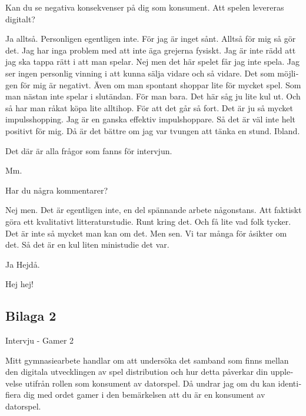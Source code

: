 \documentclass[11p]{article}
\begin{document}
\begin{otherlanguage}{swedish}
        \setlength{\leftskip}{0cm}

        Kan du se negativa konsekvenser på dig som konsument. Att spelen levereras digitalt?

        \setlength{\leftskip}{1cm}

        Ja alltså. Personligen egentligen inte. För jag är inget sånt. Alltså för mig så gör det.
        Jag har inga problem med att inte äga grejerna fysiskt. Jag är inte rädd att jag ska tappa rätt i att man spelar. Nej men det här spelet får jag inte spela.
        Jag ser ingen personlig vinning i att kunna sälja vidare och så vidare. Det som möjligen för mig är negativt. Även om man spontant shoppar lite för mycket spel.
        Som man nästan inte spelar i slutändan. För man bara. Det här såg ju lite kul ut. Och så har man råkat köpa lite alltihop. För att det går så fort. Det är ju så mycket impulsshopping. Jag är en ganska effektiv impulshoppare.
        Så det är väl inte helt positivt för mig. Då är det bättre om jag var tvungen att tänka en stund. Ibland.


        \setlength{\leftskip}{0cm}
        Det där är alla frågor som fanns för intervjun.

        \setlength{\leftskip}{1cm}

        Mm.

        \setlength{\leftskip}{0cm}
        Har du några kommentarer?

        \setlength{\leftskip}{1cm}
        Nej men. Det är egentligen inte, en del spännande arbete någonstans. Att faktiskt göra ett kvalitativt litteraturstudie.
        Runt kring det. Och få lite vad folk tycker. Det är inte så mycket man kan om det. Men sen. Vi tar många för åsikter om det. Så det är en kul liten ministudie det var.




        \setlength{\leftskip}{0cm}
        Ja Hejdå.


        \setlength{\leftskip}{1cm}
        Hej hej!

        \setlength{\leftskip}{0cm}


    \subsection{Bilaga 2}

    Intervju - Gamer 2


    Mitt gymnasiearbete handlar om att undersöka det samband som finns mellan den digitala utvecklingen av spel distribution och hur detta påverkar din upplevelse utifrån rollen som konsument av datorspel.
    Då undrar jag om du kan identifiera dig med ordet gamer i den bemärkelsen att du är en konsument av datorspel.



\end{otherlanguage}
\end{document}
